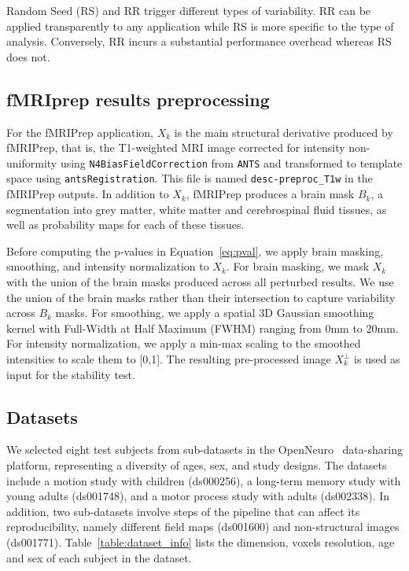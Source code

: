 \documentclass[lettersize,journal]{IEEEtran}
\newcommand{\fmriprep}{fMRIPrep\xspace}
\newcommand{\fwhm}{\textsc{FWHM}}
\begin{document}
Random Seed (RS) and RR trigger different types of variability. RR can be applied transparently to any application while RS is more specific to the type of analysis. Conversely, RR incurs a substantial performance overhead whereas RS does not.

\subsection{fMRIprep results preprocessing}

For the \fmriprep application, $X_k$ is the main structural derivative produced by \fmriprep, that is, the T1-weighted MRI image corrected for intensity non-uniformity using \texttt{N4BiasFieldCorrection} from \texttt{ANTS} and transformed to template space using \texttt{antsRegistration}. This file is named \texttt{desc-preproc\_T1w} in the \fmriprep outputs. In addition to $X_k$, \fmriprep produces a brain mask $B_k$, a segmentation into grey matter, white matter and cerebrospinal fluid tissues, as well as probability maps for each of these tissues.

Before computing the p-values in Equation~\ref{eq:pval}, we apply brain masking, smoothing, and intensity normalization to $X_k$. For brain masking, we mask $X_k$ with the union of the brain masks produced across all perturbed results. We use the union of the brain masks rather than their intersection to capture variability across $B_k$ masks. For smoothing, we apply a spatial 3D Gaussian smoothing kernel with Full-Width at Half Maximum (\fwhm) ranging from 0mm to 20mm. For intensity normalization, we apply a min-max scaling to the smoothed intensities to scale them to [0,1].
The resulting pre-processed image $X_k^\perp$ is used as input for the stability test.

\subsection{Datasets}

We selected eight test subjects from sub-datasets in the OpenNeuro~\cite{markiewicz2021openneuro} data-sharing platform, representing a diversity of ages, sex, and study designs. The datasets include a motion study with children (ds000256), a long-term memory study with young adults (ds001748), and a motor process study with adults (ds002338). In addition, two sub-datasets involve steps of the pipeline that can affect its reproducibility, namely different field maps (ds001600) and non-structural images (ds001771). Table~\ref{table:dataset_info} lists the dimension, voxels resolution, age and sex of each subject in the dataset.
\end{document}
